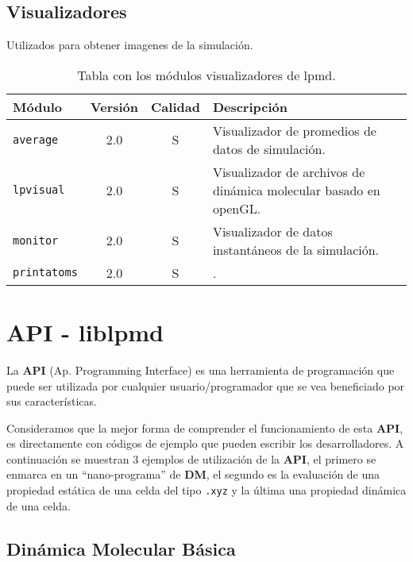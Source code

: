 \section{Visualizadores}
Utilizados para obtener imagenes de la simulaci\'on.

\begin{table}[h!]\centering
 \begin{tabular}{|l|c|c|p{10cm}|}\hline
 M\'odulo & Versi\'on & Calidad & Descripci\'on \\
 \hline\hline
 \texttt{average} & 2.0 & S & Visualizador de promedios de datos de simulaci\'on.\\
 \hline
 \texttt{lpvisual} & 2.0 & S & Visualizador de archivos de din\'amica molecular basado en openGL.\\
 \hline
 \texttt{monitor} & 2.0 & S & Visualizador de datos instant\'aneos de la simulaci\'on.\\
 \hline
 \texttt{printatoms} & 2.0 & S & .\\
 \hline
 \end{tabular}
\label{tab:modgvisual}
\caption{Tabla con los m\'odulos visualizadores de lpmd.}
\end{table}



\chapter{API - liblpmd}
\label{ap:API}
La \textbf{API} (Ap. Programming Interface) es una herramienta de programaci\'on que puede ser utilizada por cualquier usuario/programador que se vea beneficiado por sus caracter\'isticas.

Consideramos que la mejor forma de comprender el funcionamiento de esta \textbf{API}, es directamente con c\'odigos de ejemplo que pueden escribir los desarrolladores. A continuaci\'on se muestran 3 ejemplos de utilizaci\'on de la \textbf{API}, el primero se enmarca en un ``nano-programa'' de \textbf{DM}, el segundo es la evaluaci\'on de una propiedad est\'atica de una celda del tipo \texttt{.xyz} y la \'ultima una propiedad din\'amica de una celda.

\section{Din\'amica Molecular B\'asica}

